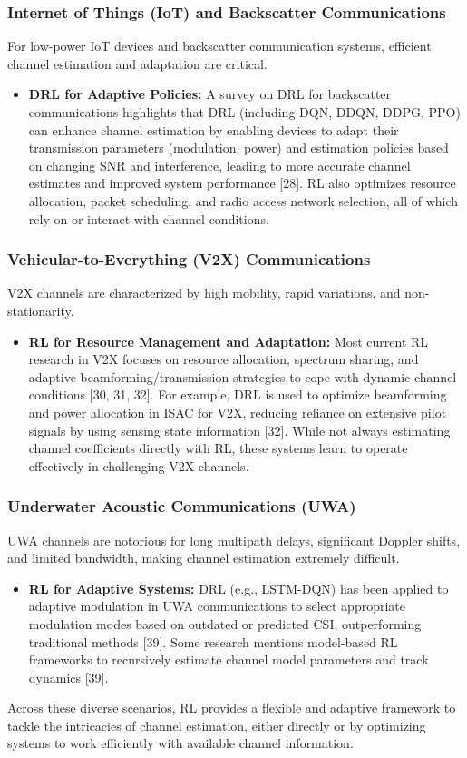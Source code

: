 \documentclass[journal,twocolumn]{IEEEtran}
\begin{document}
\subsubsection{Internet of Things (IoT) and Backscatter Communications}
For low-power IoT devices and backscatter communication systems, efficient channel estimation and adaptation are critical.
\begin{itemize}
    \item \textbf{DRL for Adaptive Policies:} A survey on DRL for backscatter communications highlights that DRL (including DQN, DDQN, DDPG, PPO) can enhance channel estimation by enabling devices to adapt their transmission parameters (modulation, power) and estimation policies based on changing SNR and interference, leading to more accurate channel estimates and improved system performance [28]. RL also optimizes resource allocation, packet scheduling, and radio access network selection, all of which rely on or interact with channel conditions.
\end{itemize}

\subsubsection{Vehicular-to-Everything (V2X) Communications}
V2X channels are characterized by high mobility, rapid variations, and non-stationarity.
\begin{itemize}
    \item \textbf{RL for Resource Management and Adaptation:} Most current RL research in V2X focuses on resource allocation, spectrum sharing, and adaptive beamforming/transmission strategies to cope with dynamic channel conditions [30, 31, 32]. For example, DRL is used to optimize beamforming and power allocation in ISAC for V2X, reducing reliance on extensive pilot signals by using sensing state information [32]. While not always estimating channel coefficients directly with RL, these systems learn to operate effectively in challenging V2X channels.
\end{itemize}

\subsubsection{Underwater Acoustic Communications (UWA)}
UWA channels are notorious for long multipath delays, significant Doppler shifts, and limited bandwidth, making channel estimation extremely difficult.
\begin{itemize}
    \item \textbf{RL for Adaptive Systems:} DRL (e.g., LSTM-DQN) has been applied to adaptive modulation in UWA communications to select appropriate modulation modes based on outdated or predicted CSI, outperforming traditional methods [39]. Some research mentions model-based RL frameworks to recursively estimate channel model parameters and track dynamics [39].
\end{itemize}
Across these diverse scenarios, RL provides a flexible and adaptive framework to tackle the intricacies of channel estimation, either directly or by optimizing systems to work efficiently with available channel information.
\end{document}

